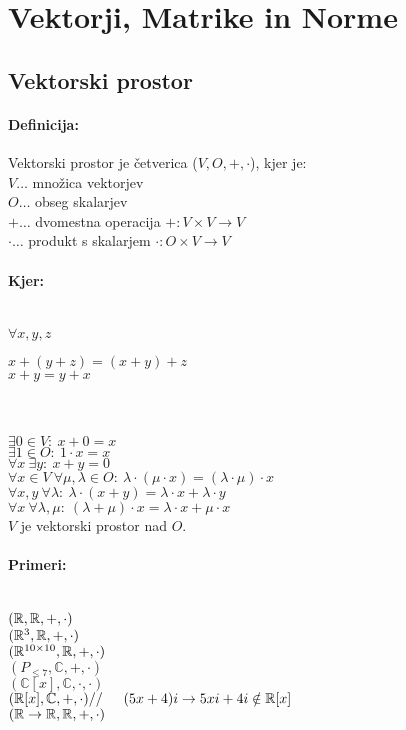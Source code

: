 \section{Vektorji, Matrike in Norme} 
\subsection{Vektorski prostor}
\paragraph{Definicija:} Vektorski prostor je četverica ($V, O, +, \cdot$), kjer je:\\
\indent $V \dots$ množica vektorjev\\
\indent $O \dots$ obseg skalarjev\\
\indent $+ \dots$ dvomestna operacija $+: V \times V \rightarrow V$\\
\indent $\cdot \dots$ produkt s skalarjem $\cdot: O \times V \rightarrow V$\\

\paragraph{Kjer:}\ \\
\indent $\forall x, y, z$\indent 
\begin{minipage}{0.5\textwidth}
	$x + (y + z) = (x + y) + z$\\
	$x + y = y + x$
\end{minipage}\\\\
\indent $\exists 0 \in V:\ x+0 = x$\\
\indent $\exists 1 \in O:\ 1\cdot x = x$\\
\indent $\forall x\ \exists y:\ x + y = 0$\\
\indent $\forall x \in V\ \forall \mu, \lambda \in O:\ \lambda \cdot (\mu \cdot x) = (\lambda \cdot \mu) \cdot x$\\
\indent $\forall x,y\ \forall \lambda :\ \lambda \cdot (x + y) = \lambda \cdot x + \lambda \cdot y$\\
\indent $\forall x\ \forall \lambda, \mu :\ (\lambda + \mu) \cdot x = \lambda \cdot x + \mu \cdot x$\\

\noindent $V$ je vektorski prostor nad $O$.
\paragraph{Primeri:}\ \\
\indent $(\mathbb{R}, \mathbb{R}, +, \cdot)$\\
\indent $(\mathbb{R}^3, \mathbb{R}, +, \cdot)$\\
\indent $(\mathbb{R}^{10\times 10}, \mathbb{R}, +, \cdot)$\\
\indent $(P_{\leq 7}, \mathbb{C}, +, \cdot)$\\
\indent $(\mathbb{C}[x], \mathbb{C}, \cdot, \cdot)$\\
\indent $(\R[x], \mathbb{C}, +, \cdot) // \indent (5x + 4)i \rightarrow 5xi + 4i \notin \R[x]$\\
\indent $(\mathbb{R} \rightarrow \mathbb{R}, \mathbb{R}, +, \cdot)$

